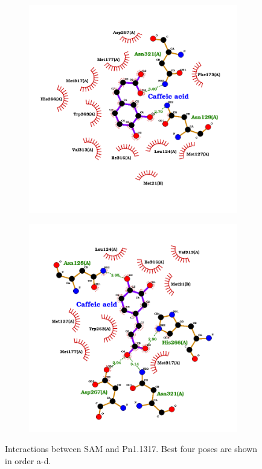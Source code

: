 \documentclass[12pt]{article}
\begin{document}
\begin{figure}[h!]
\begin{subfigure}[h!]{0.35\textwidth}
			\caption{}
		\end{subfigure}
		\hfill
		\begin{subfigure}[h!]{0.35\textwidth}
			\hspace{2cm}
			\includegraphics[width=\textwidth]{../4/Dock/Dock2/best3.png}
			\caption{}
		\end{subfigure}
		\hfill
		\begin{subfigure}[h!]{0.35\textwidth}
			\hspace{-2cm}
			\includegraphics[width=\textwidth]{../4/Dock/Dock2/best4.png}
			\caption{}
		\end{subfigure}
		\hfill
		\caption[Interactions between caffeic acid and SAM-Pn1.1317 complex.]{\centering Interactions between SAM and Pn1.1317. Best four poses are shown in order a-d.}
		\label{fig4_9}
	\end{figure}
\end{document}

